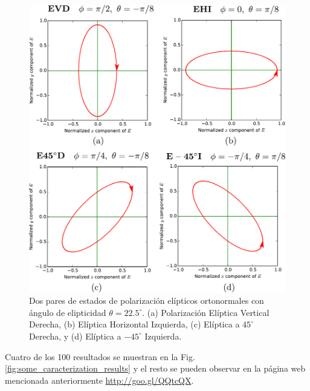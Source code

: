 \begin{figure}
\centering
\includegraphics[scale = .6]{EVD_EHI_E45D_Em45I.pdf}
\caption[Estados de polarización elípticos]{Dos pares de estados de polarización
  elípticos ortonormales con ángulo de elipticidad $\theta = 22.5^{\circ}$. (a) Polarización Elíptica Vertical Derecha,
  (b) Elíptica Horizontal Izquierda, (c) Elíptica a $45^{\circ}$
  Derecha, y (d) Elíptica a $-45^{\circ}$ Izquierda.}
\label{fig:elliptic_states}
\end{figure}
Cuatro de los 100 resultados se muestran en la
Fig. \ref{fig:some_caracterization_results} y el resto se pueden
observar en la página web mencionada anteriormente \href{http://goo.gl/QQtcQX}{http://goo.gl/QQtcQX}. 
\newpage
